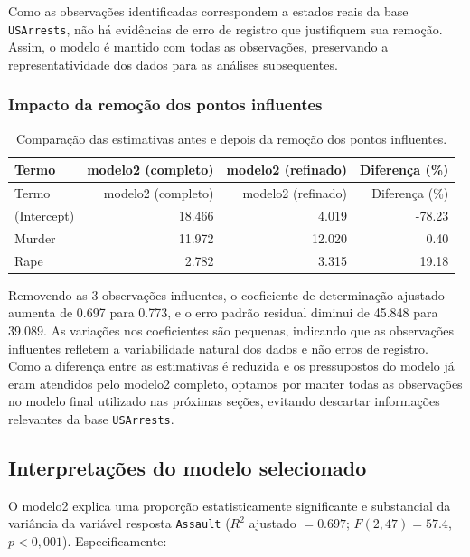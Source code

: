\documentclass[a4paper]{modeloUFCG} %
\begin{document}
Como as observações identificadas correspondem a estados reais da base \texttt{USArrests}, não há evidências de erro de registro que justifiquem
sua remoção. Assim, o modelo é mantido com todas as observações, preservando a representatividade dos dados para as análises subsequentes.

\subsubsection{Impacto da remoção dos pontos influentes}\label{impacto-da-remouxe7uxe3o-dos-pontos-influentes}

\begin{longtable}[]{@{}lrrr@{}}
\caption{\label{tab:comparaCoef} Comparação das estimativas antes e depois da remoção dos pontos influentes.}\tabularnewline
\toprule\noalign{}
Termo & modelo2 (completo) & modelo2 (refinado) & Diferença (\%) \\
\midrule\noalign{}
\endfirsthead
\toprule\noalign{}
Termo & modelo2 (completo) & modelo2 (refinado) & Diferença (\%) \\
\midrule\noalign{}
\endhead
\bottomrule\noalign{}
\endlastfoot
(Intercept) & 18.466 & 4.019 & -78.23 \\
Murder & 11.972 & 12.020 & 0.40 \\
Rape & 2.782 & 3.315 & 19.18 \\
\end{longtable}

Removendo as 3 observações influentes, o coeficiente de determinação ajustado aumenta de
0.697 para 0.773, e o erro padrão residual diminui
de 45.848 para 39.089. As variações nos coeficientes são pequenas,
indicando que as observações influentes refletem a variabilidade natural dos dados e não erros de registro. Como a diferença entre as
estimativas é reduzida e os pressupostos do modelo já eram atendidos pelo modelo2 completo, optamos por manter todas as observações no
modelo final utilizado nas próximas seções, evitando descartar informações relevantes da base \texttt{USArrests}.

\subsection{Interpretações do modelo selecionado}\label{interpretauxe7uxf5es-do-modelo-selecionado}

O modelo2 explica uma proporção estatisticamente significante e substancial da variância da variável resposta \texttt{Assault}
(\(R^2\) ajustado \(= 0.697\);
\(F(2, 47) = 57.4\), \(p<0{,}001\)). Especificamente:
\end{document}

